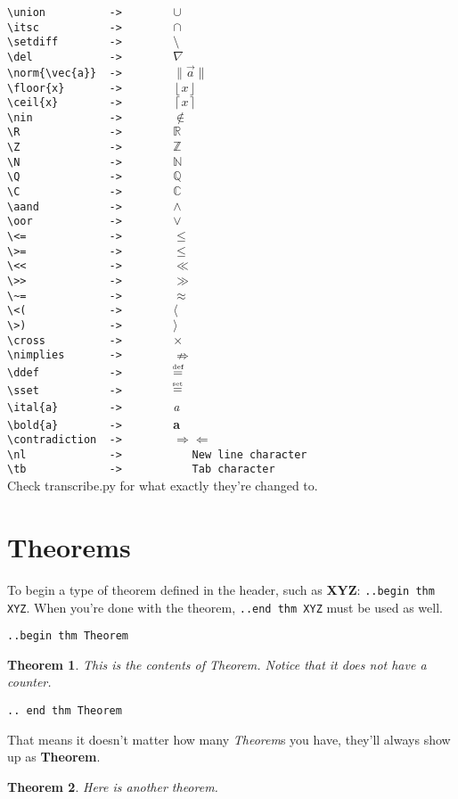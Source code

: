 \documentclass[12pt]{article}
\newcommand{\union}{\cup}
\newcommand{\itsc}{\cap}
\newcommand{\setdiff}{\setminus}
\newcommand{\del}{\nabla}
\newcommand{\Q}{\mathbb{Q}}
\newcommand{\R}{\mathbb{R}}
\newcommand{\Z}{\mathbb{Z}}
\newcommand{\N}{\mathbb{N}}
\newcommand{\C}{\mathbb{C}}
\newcommand{\nin}{\notin}
\newcommand{\ital}{\emph}
\newcommand{\contradiction}{$\Rightarrow\Leftarrow$}
\newcommand{\aand}{\wedge}
\newcommand{\oor}{\vee}
\newcommand{\cross}{\times}
\newcommand{\nimplies}{\nRightarrow}
\newcommand{\nl}{\\}
\newcommand{\tb}{\quad}
\newcommand{\norm}[1]{\|#1\|}
\newcommand{\ddef}{\mathrel{\stackrel{\makebox[0pt]{\mbox{\normalfont\tiny def}}}{=}}}
\newcommand{\sset}{\mathrel{\stackrel{\makebox[0pt]{\mbox{\normalfont\tiny set}}}{=}}}
\newcommand{\floor}[1]{\left\lfloor #1 \right\rfloor}
\newcommand{\ceil}[1]{\left\lceil #1 \right\rceil}
\renewcommand\bold{\textbf}
\newtheorem*{Theorem}{Theorem}
\begin{document}
\begin{flushleft}
\verb|\union          ->        |$\union$\nl
\verb|\itsc           ->        |$\itsc$\nl
\verb|\setdiff        ->        |$\setdiff$\nl
\verb|\del            ->        |$\del$\nl
\verb|\norm{\vec{a}}  ->        |$\norm{\vec{a}}$\nl
\verb|\floor{x}       ->        |$\floor{x}$\nl
\verb|\ceil{x}        ->        |$\ceil{x}$\nl
\verb|\nin            ->        |$\nin$\nl
\verb|\R              ->        |$\R$\nl
\verb|\Z              ->        |$\Z$\nl
\verb|\N              ->        |$\N$\nl
\verb|\Q              ->        |$\Q$\nl
\verb|\C              ->        |$\C$\nl
\verb|\aand           ->        |$\aand$\nl
\verb|\oor            ->        |$\oor$\nl
\verb|\<=             ->        |$\leq$\nl
\verb|\>=             ->        |$\leq$\nl
\verb|\<<             ->        |$\ll$\nl
\verb|\>>             ->        |$\gg$\nl
\verb|\~=             ->        |$\approx$\nl
\verb|\<(             ->        |$\langle$\nl
\verb|\>)             ->        |$\rangle$\nl
\verb|\cross          ->        |$\cross$\nl
\verb|\nimplies       ->        |$\nimplies$\nl
\verb|\ddef           ->        |$\ddef$\nl
\verb|\sset           ->        |$\sset$\nl
\bigskip
\verb|\ital{a}        ->        |\ital{a}\nl
\verb|\bold{a}        ->        |\bold{a}\nl
\verb|\contradiction  ->        |\contradiction \nl
\verb|\nl             ->           New line character|\nl
\verb|\tb             ->           Tab character|\nl
\bigskip
Check transcribe.py for what exactly they're changed to.

\newpage

\section*{Theorems}

\bigskip

To begin a type of theorem defined in the header, such as \bold{XYZ}: \verb|..begin thm XYZ|. When you're done with the theorem, \verb|..end thm XYZ| must be used as well.

\medskip

\verb|..begin thm Theorem|
\begin{Theorem}
This is the contents of Theorem. Notice that it does not have a counter.
\end{Theorem}
\verb|.. end thm Theorem|

\medskip

That means it doesn't matter how many \ital{Theorem}s you have, they'll always show up as \bold{Theorem}.

\begin{Theorem}
Here is another theorem.
\end{Theorem}


\end{flushleft}
\end{document}

